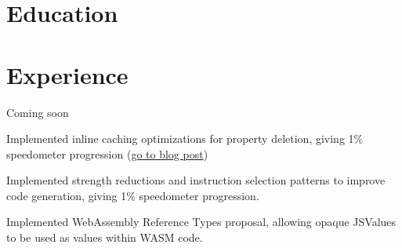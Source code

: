 \documentclass[12pt]{jmichaud-resume}
\begin{document}
\begin{minipage}[t]{0.29\textwidth}
\vspace{20pt}

\section{Education} 




\end{minipage}
\hfill
\begin{minipage}[t]{0.64\textwidth}
\section{Experience}

 \hfill {}

\vspace{10pt}
\begin{tightemize}
	\item Coming soon
\end{tightemize}
\sectionsep

 \hfill {}

\vspace{10pt}
\begin{tightemize}
	\item Implemented inline caching optimizations for property deletion, giving 1\% speedometer progression (\href{https://webkit.org/blog/10298/inline-caching-delete/}{go to blog post})
	
\end{tightemize}
\hfill {}
\begin{tightemize}
	\item Implemented strength reductions and instruction selection patterns to improve code generation, giving 1\% speedometer progression.
	\item Implemented WebAssembly Reference Types proposal, allowing opaque JSValues to be used as values within WASM code.
	
\end{tightemize}
\sectionsep
{} \hfill {}


\end{minipage}
\end{document}
